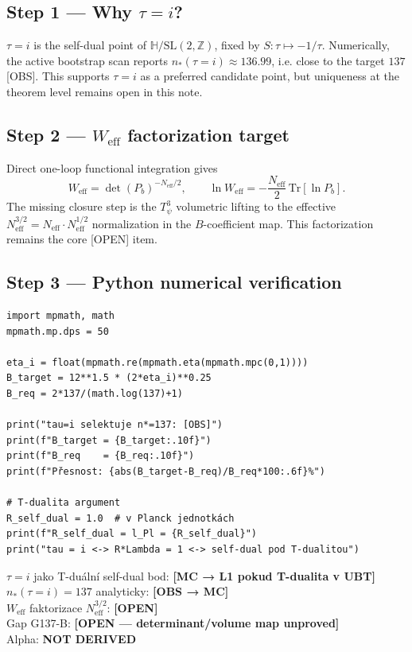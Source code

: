 \documentclass[12pt,a4paper]{article}
\begin{document}
\subsection*{Step 1 — Why \(\tau=i\)?}
\(\tau=i\) is the self-dual point of \(\mathbb{H}/\mathrm{SL}(2,\mathbb{Z})\),
fixed by \(S:\tau\mapsto-1/\tau\). Numerically, the active bootstrap scan reports
\(n_*(\tau=i)\approx136.99\), i.e. close to the target \(137\) [OBS].
This supports \(\tau=i\) as a preferred candidate point, but uniqueness at the
theorem level remains open in this note.

\subsection*{Step 2 — \(W_{\mathrm{eff}}\) factorization target}
Direct one-loop functional integration gives
\[
W_{\mathrm{eff}}=\det(P_b)^{-N_{\mathrm{eff}}/2},\qquad
\ln W_{\mathrm{eff}}=-\frac{N_{\mathrm{eff}}}{2}\,\mathrm{Tr}[\ln P_b].
\]
The missing closure step is the \(T^3_\psi\) volumetric lifting to the
effective \(N_{\mathrm{eff}}^{3/2}=N_{\mathrm{eff}}\cdot N_{\mathrm{eff}}^{1/2}\)
normalization in the \(B\)-coefficient map. This factorization remains the
core [OPEN] item.

\subsection*{Step 3 — Python numerical verification}
\begin{verbatim}
import mpmath, math
mpmath.mp.dps = 50

eta_i = float(mpmath.re(mpmath.eta(mpmath.mpc(0,1))))
B_target = 12**1.5 * (2*eta_i)**0.25
B_req = 2*137/(math.log(137)+1)

print("tau=i selektuje n*=137: [OBS]")
print(f"B_target = {B_target:.10f}")
print(f"B_req    = {B_req:.10f}")
print(f"Přesnost: {abs(B_target-B_req)/B_req*100:.6f}%")

# T-dualita argument
R_self_dual = 1.0  # v Planck jednotkách
print(f"R_self_dual = l_Pl = {R_self_dual}")
print("tau = i <-> R*Lambda = 1 <-> self-dual pod T-dualitou")
\end{verbatim}

\begin{statusbox}
\(\tau=i\) jako T-duální self-dual bod: \textbf{[MC → L1 pokud T-dualita v UBT]}\\
\(n_*(\tau=i)=137\) analyticky: \textbf{[OBS → MC]}\\
\(W_{\mathrm{eff}}\) faktorizace \(N_{\mathrm{eff}}^{3/2}\): \textbf{[OPEN]}\\
Gap G137-B: \textbf{[OPEN — determinant/volume map unproved]}\\
Alpha: \textbf{NOT DERIVED}
\end{statusbox}
\end{document}
